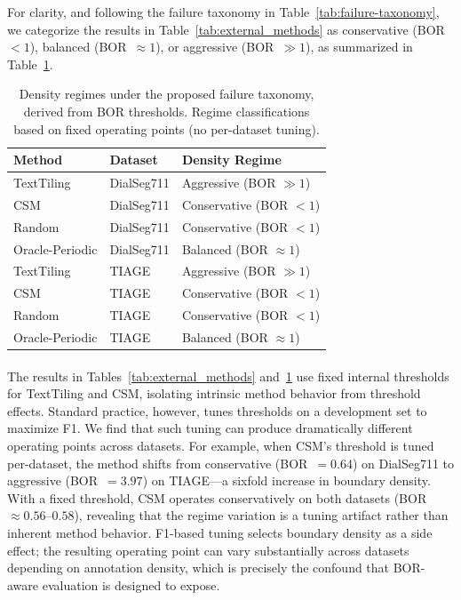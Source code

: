 \documentclass{article}
\makeatletter
\newcommand{\myparagraph}[1]{%
  \paragraph{\@addpunct{#1}}%
}
\makeatother
\begin{document}
For clarity, and following the failure taxonomy in
Table~\ref{tab:failure-taxonomy}, we categorize the results in
Table~\ref{tab:external_methods} as conservative (BOR~$<1$), balanced
(BOR~$\approx 1$), or aggressive (BOR~$\gg 1$), as summarized in
Table~\ref{tab:regime_summary}.

\begin{table}[t]
  \centering
  \begin{tabular}{l l l}
    \toprule
    Method & Dataset & Density Regime \\
    \midrule
    TextTiling & DialSeg711 & Aggressive (BOR $\gg 1$) \\
    CSM        & DialSeg711 & Conservative (BOR $< 1$) \\
    Random     & DialSeg711 & Conservative (BOR $< 1$) \\
    Oracle-Periodic & DialSeg711 & Balanced (BOR $\approx 1$) \\
    \midrule
    TextTiling & TIAGE      & Aggressive (BOR $\gg 1$) \\
    CSM        & TIAGE      & Conservative (BOR $< 1$) \\
    Random     & TIAGE      & Conservative (BOR $< 1$) \\
    Oracle-Periodic & TIAGE & Balanced (BOR $\approx 1$) \\
    \bottomrule
  \end{tabular}
  \caption{Density regimes under the proposed failure taxonomy, derived from BOR thresholds.
    Regime classifications based on fixed operating points (no per-dataset tuning).}
  \label{tab:regime_summary}
\end{table}

\myparagraph{Threshold tuning and density side effects}
The results in Tables~\ref{tab:external_methods} and~\ref{tab:regime_summary}
use fixed internal thresholds for TextTiling and CSM, isolating intrinsic
method behavior from threshold effects. Standard practice, however, tunes
thresholds on a development set to maximize F1. We find that such tuning
can produce dramatically different operating points across datasets. For
example, when CSM's threshold is tuned per-dataset, the method shifts from
conservative (BOR~$=0.64$) on DialSeg711 to aggressive (BOR~$=3.97$) on
TIAGE---a sixfold increase in boundary density. With a fixed threshold,
CSM operates conservatively on both datasets (BOR~$\approx 0.56$--$0.58$),
revealing that the regime variation is a tuning artifact rather than inherent
method behavior. F1-based tuning selects boundary density as a side effect;
the resulting operating point can vary substantially across datasets
depending on annotation density, which is precisely the confound that
BOR-aware evaluation is designed to expose.
\end{document}
